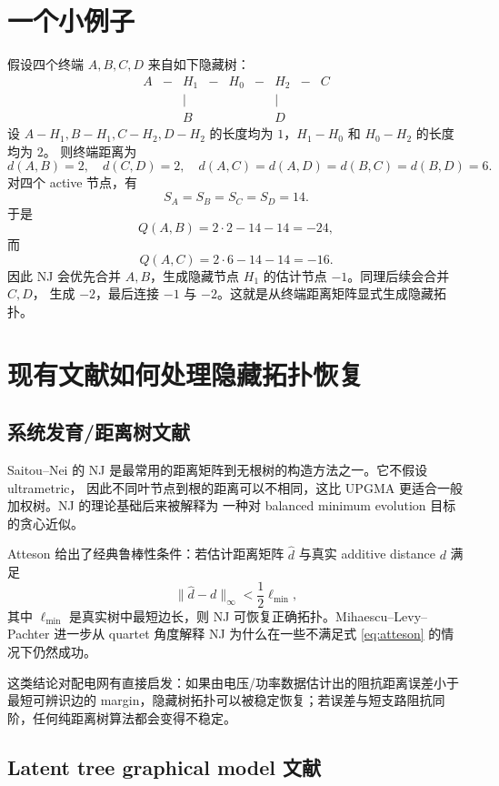 \documentclass[UTF8,11pt]{ctexart}
\begin{document}
\section{一个小例子}

假设四个终端 $A,B,C,D$ 来自如下隐藏树：
\[
\begin{array}{ccccccccc}
A &-& H_1 &-& H_0 &-& H_2 &-& C\\
  && |   &&     && |   \\
  && B   &&     && D
\end{array}
\]
设 $A-H_1,B-H_1,C-H_2,D-H_2$ 的长度均为 $1$，$H_1-H_0$ 和 $H_0-H_2$ 的长度均为 $2$。
则终端距离为
\[
d(A,B)=2,\quad d(C,D)=2,\quad
d(A,C)=d(A,D)=d(B,C)=d(B,D)=6.
\]
对四个 active 节点，有
\[
S_A=S_B=S_C=S_D=14.
\]
于是
\[
Q(A,B)=2\cdot 2-14-14=-24,
\]
而
\[
Q(A,C)=2\cdot 6-14-14=-16.
\]
因此 NJ 会优先合并 $A,B$，生成隐藏节点 $H_1$ 的估计节点 $-1$。同理后续会合并 $C,D$，
生成 $-2$，最后连接 $-1$ 与 $-2$。这就是从终端距离矩阵显式生成隐藏拓扑。

\section{现有文献如何处理隐藏拓扑恢复}

\subsection{系统发育/距离树文献}

Saitou--Nei 的 NJ 是最常用的距离矩阵到无根树的构造方法之一。它不假设 ultrametric，
因此不同叶节点到根的距离可以不相同，这比 UPGMA 更适合一般加权树。NJ 的理论基础后来被解释为
一种对 balanced minimum evolution 目标的贪心近似。

Atteson 给出了经典鲁棒性条件：若估计距离矩阵 $\hat d$ 与真实 additive distance $d$ 满足
\begin{equation}
  \|\hat d-d\|_\infty < \frac{1}{2}\ell_{\min},
  \label{eq:atteson}
\end{equation}
其中 $\ell_{\min}$ 是真实树中最短边长，则 NJ 可恢复正确拓扑。Mihaescu--Levy--Pachter
进一步从 quartet 角度解释 NJ 为什么在一些不满足式 \eqref{eq:atteson} 的情况下仍然成功。

这类结论对配电网有直接启发：如果由电压/功率数据估计出的阻抗距离误差小于最短可辨识边的
margin，隐藏树拓扑可以被稳定恢复；若误差与短支路阻抗同阶，任何纯距离树算法都会变得不稳定。

\subsection{Latent tree graphical model 文献}
\end{document}
